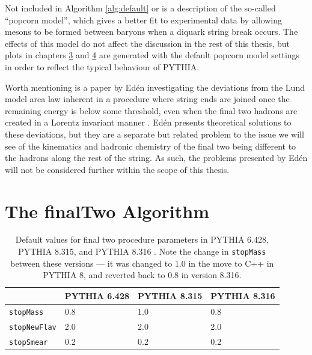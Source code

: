 \documentclass[12pt,a4paper]{report}
\begin{document}

Not included in Algorithm \ref{alg:default} or is a description of the so-called ``popcorn model'', which gives a better fit to experimental data by allowing mesons to be formed between baryons when a diquark string break occurs. The effects of this model do not affect the discussion in the rest of this thesis, but plots in chapters \hyperref[chap:fragmentation]{3} and \hyperref[chap:tuning]{4} are generated with the default popcorn model settings in order to reflect the typical behaviour of PYTHIA.

Worth mentioning is a paper by Ed\'en investigating the deviations from the Lund model area law inherent in a procedure where string ends are joined once the remaining energy is below some threshold, even when the final two hadrons are created in a Lorentz invariant manner \cite{Eden:2000in}. Ed\'en presents theoretical solutions to these deviations, but they are a separate but related problem to the issue we will see of the kinematics and hadronic chemistry of the final two being different to the hadrons along the rest of the string. As such, the problems presented by Ed\'en will not be considered further within the scope of this thesis.

\section{The finalTwo Algorithm}
\label{sec:final-two}
\begin{table}
  \centering
  \begin{tabular}{l|lll}
    & \textbf{PYTHIA 6.428} & \textbf{PYTHIA 8.315} & \textbf{PYTHIA 8.316} \\ \hline
    \texttt{stopMass}    & 0.8               & 1.0         & 0.8      \\
    \texttt{stopNewFlav} & 2.0               & 2.0          & 2.0     \\
    \texttt{stopSmear}                   & 0.2               & 0.2 & 0.2
  \end{tabular}
  \caption{Default values for final two procedure parameters in PYTHIA 6.428, PYTHIA 8.315, and PYTHIA 8.316 \cite{PYTHIAmanualold,Sjostrand:2006za}. Note the change in \texttt{stopMass} between these versions --- it was changed to 1.0 in the move to C++ in PYTHIA 8, and reverted back to 0.8 in version 8.316.}
  \label{tab:defaults}
\end{table}
\end{document}
